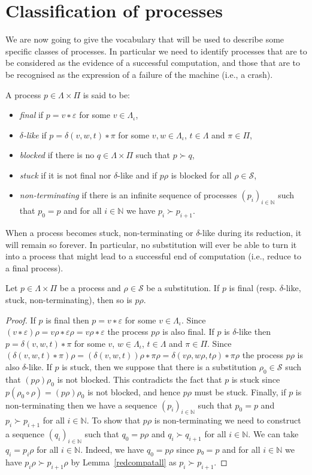 \section{Classification of processes}

We are now going to give the vocabulary that will be used to describe some
specific classes of processes. In particular we need to identify processes
that are to be considered as the evidence of a successful computation, and
those that are to be recognised as the expression of a failure of the
machine (i.e., a crash).
\begin{definition}
  A process $p ∈ Λ×Π$ is said to be:
  \begin{itemize}
    \item \emph{final} if $p = v∗ε$ for some $v ∈ Λ_{ι}$,
    \item \emph{$δ$-like} if $p = δ(v,w,t) ∗ π$ for some $v,w ∈ Λ_{ι}$,
      $t ∈ Λ$ and $π ∈ Π$,
    \item \emph{blocked} if there is no $q ∈ Λ×Π$ such that $p ≻ q$,
    \item \emph{stuck} if it is not final nor $δ$-like and if $pρ$ is
      blocked for all $ρ ∈ \mathcal{S}$,
    \item \emph{non-terminating} if there is an infinite sequence of
      processes $(p_i)_{i∈\mathbb{N}}$ such that $p_0 = p$ and for all
      $i∈\mathbb{N}$ we have $p_i ≻ p_{i+1}$.
  \end{itemize}
\end{definition}

When a process becomes stuck, non-terminating or $δ$-like during its
reduction, it will remain so forever. In particular, no substitution
will ever be able to turn it into a process that might lead to a
successful end of computation (i.e., reduce to a final process).
\begin{lemma}
  Let $p ∈ Λ×Π$ be a process and $ρ ∈ \mathcal{S}$ be a substitution. If $p$
  is final (resp. $δ$-like, stuck, non-terminating), then so is $pρ$.
  \begin{proof}
    If $p$ is final then $p = v∗ε$ for some $v ∈ Λ_{ι}$. Since $(v∗ε)ρ =
    vρ∗ερ = vρ∗ε$ the process $pρ$ is also final. If $p$ is $δ$-like then
    $p = δ(v,w,t)∗π$ for some $v$, $w ∈ Λ_{ι}$, $t ∈ Λ$ and $π ∈ Π$. Since
    $(δ(v,w,t)∗π)ρ = (δ(v,w,t))ρ ∗ πρ = δ(vρ,wρ,tρ) ∗ πρ$ the process $pρ$
    is also $δ$-like. If $p$ is stuck, then we suppose that there is a
    substitution $ρ_0 ∈ \mathcal{S}$ such that $(pρ)ρ_0$ is not blocked.
    This contradicts the fact that $p$ is stuck since $p(ρ_0 ∘ ρ) = (pρ)ρ_0$
    is not blocked, and hence $pρ$ must be stuck. Finally, if $p$ is
    non-terminating then we have a sequence $(p_i)_{i∈\mathbb{N}}$ such that
    $p_0 = p$ and $p_i ≻ p_{i+1}$ for all $i ∈ \mathbb{N}$. To show that
    $pρ$ is non-terminating we need to construct a sequence
    $(q_i)_{i∈\mathbb{N}}$ such that $q_0 = pρ$ and $q_i ≻ q_{i+1}$ for
    all $i ∈ \mathbb{N}$. We can take $q_i = p_iρ$ for all $i ∈ \mathbb{N}$.
    Indeed, we have $q_0 = pρ$ since $p₀ = p$ and for all $i ∈ \mathbb{N}$ we
    have $p_iρ ≻ p_{i+1}ρ$ by Lemma~\ref{redcompatall} as $p_i ≻ p_{i+1}$.
  \end{proof}
\end{lemma}

